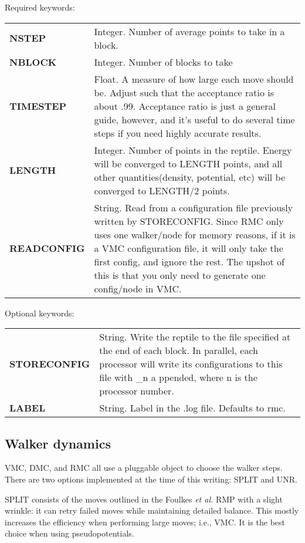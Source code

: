 \documentclass[12pt]{article}
\begin{document}
Required keywords:\\
\begin{tabular}{lp{12cm}}
{\bf NSTEP } & Integer.   Number of average points to take in a block. \\
{\bf NBLOCK} & Integer. Number of blocks to take \\
{\bf TIMESTEP} & Float. A measure of how large each move 
should be.  Adjust such that the acceptance ratio is about .99. Acceptance ratio
is just a general guide, however, and it's useful to do several time steps if you
need highly accurate results. \\
{\bf LENGTH} & Integer.  Number of points in the reptile.  Energy will be converged 
to LENGTH points, and all other quantities(density, potential, etc) will be converged to LENGTH/2 points. \\
{\bf READCONFIG } & String. Read from a configuration file
previously written by STORECONFIG.  Since RMC only uses one walker/node for memory reasons, if it is a VMC
configuration file, it will only take the first config, and ignore the rest.  The upshot of this is that you
only need to generate one config/node in VMC. \\
\end{tabular}


Optional keywords: \\
\begin{tabular}{lp{12cm}}
{\bf STORECONFIG } & String. Write the reptile to the file specified at the end of each block.  In parallel, each processor will write its configurations to this file with \_n a
ppended, where n is the processor number. \\
{\bf LABEL} & String.  Label in the .log file.  Defaults to rmc.\\
\end{tabular}


\subsection{Walker dynamics}

VMC, DMC, and RMC all use a pluggable object to choose the walker steps.  There are
two options implemented at the time of this writing: SPLIT and UNR. 

 SPLIT consists
of the moves outlined in the Foulkes {\it et al.} RMP with a slight wrinkle: it 
can retry failed moves while maintaining detailed balance.  This mostly increases 
the efficiency when performing large moves; i.e., VMC.  It is the best 
choice when using pseudopotentials.
\end{document}
